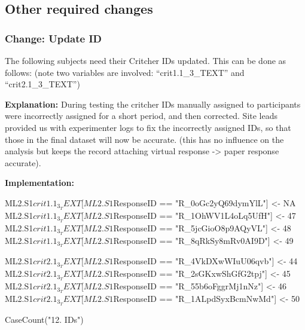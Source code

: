 \documentclass[]{article}
\newenvironment{Shaded}{\begin{snugshade}}{\end{snugshade}}
\newcommand{\KeywordTok}[1]{\textcolor[rgb]{0.94,0.87,0.69}{{#1}}}
\newcommand{\DecValTok}[1]{\textcolor[rgb]{0.86,0.86,0.80}{{#1}}}
\newcommand{\StringTok}[1]{\textcolor[rgb]{0.80,0.58,0.58}{{#1}}}
\newcommand{\OtherTok}[1]{\textcolor[rgb]{0.94,0.94,0.56}{{#1}}}
\newcommand{\NormalTok}[1]{\textcolor[rgb]{0.80,0.80,0.80}{{#1}}}
\begin{document}
\subsection{Other required changes}\label{other-required-changes}

\subsubsection{\textbf{Change:} Update ID}\label{change-update-id}

The following subjects need their Critcher IDs updated. This can be done
as follows: (note two variables are involved: ``crit1.1\_3\_TEXT'' and
``crit2.1\_3\_TEXT'')

\textbf{Explanation:} During testing the critcher IDs manually assigned
to participants were incorrectly assigned for a short period, and then
corrected. Site leads provided us with experimenter logs to fix the
incorrectly assigned IDs, so that those in the final dataset will now be
accurate. (this has no influence on the analysis but keeps the record
attaching virtual response -\textgreater{} paper response accurate).

\textbf{Implementation:}

\begin{Shaded}
\begin{Highlighting}[]
\NormalTok{ML2.S1$crit1.1_3_TEXT[ML2.S1$ResponseID ==}\StringTok{ "R_0oGc2yQ69dymYlL"}\NormalTok{] <-}\StringTok{ }\OtherTok{NA}
\NormalTok{ML2.S1$crit1.1_3_TEXT[ML2.S1$ResponseID ==}\StringTok{ "R_1OhWV1L4oLq5UfH"}\NormalTok{] <-}\StringTok{ }\DecValTok{47}
\NormalTok{ML2.S1$crit1.1_3_TEXT[ML2.S1$ResponseID ==}\StringTok{ "R_5jcGioO8p9AQyVL"}\NormalTok{] <-}\StringTok{ }\DecValTok{48}
\NormalTok{ML2.S1$crit1.1_3_TEXT[ML2.S1$ResponseID ==}\StringTok{ "R_8qRkSy8mRv0AI9D"}\NormalTok{] <-}\StringTok{ }\DecValTok{49}

\NormalTok{ML2.S1$crit2.1_3_TEXT[ML2.S1$ResponseID ==}\StringTok{ "R_4VkDXwWIuU06qvb"}\NormalTok{] <-}\StringTok{ }\DecValTok{44}
\NormalTok{ML2.S1$crit2.1_3_TEXT[ML2.S1$ResponseID ==}\StringTok{ "R_2sGKxwShGfG2tpj"}\NormalTok{] <-}\StringTok{ }\DecValTok{45}
\NormalTok{ML2.S1$crit2.1_3_TEXT[ML2.S1$ResponseID ==}\StringTok{ "R_55b6oFggrMj1nNz"}\NormalTok{] <-}\StringTok{ }\DecValTok{46}
\NormalTok{ML2.S1$crit2.1_3_TEXT[ML2.S1$ResponseID ==}\StringTok{ "R_1ALpdSyxBcmNwMd"}\NormalTok{] <-}\StringTok{ }\DecValTok{50}

\KeywordTok{CaseCount}\NormalTok{(}\StringTok{"12. IDs"}\NormalTok{)}
\end{Highlighting}
\end{Shaded}
\end{document}
